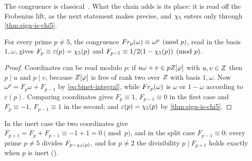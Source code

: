 \begin{remark}
The congruence is classical~\cite{lucas1878,lehmer30}.  What the chain adds is its place: it is
read off the Frobenius lift, as the next statement makes precise, and $\chi_5$ enters only through
\cref{thm:sign-is-chi5}.
\end{remark}

\begin{corollary}\label{thm:chi5-from-frobenius}
For every prime $p\ne5$, the congruence $Fr_p(\omega)\equiv\omega^p\pmod p$, read in the basis
$1,\omega$, gives $F_p\equiv\varepsilon(p)=\chi_5(p)$ and $F_{p-1}\equiv1/2(1-\chi_5(p))\pmod p$.
\end{corollary}
\begin{proof}
Coordinates can be read modulo $p$: if
$u\omega+v\in pZ[\varphi]$ with $u,v\in Z$ then $p\mid u$ and $p\mid v$, because $Z[\varphi]$ is free of rank two
over $Z$ with basis $1,\omega$.  Now
$\omega^p=F_p\omega+F_{p-1}$ by \eqref{eq:binet-integral}, while
$Fr_p(\omega)$ is $\omega$ or $1-\omega$ according to $\varepsilon(p)$.  Comparing
coordinates gives $F_p\equiv1$, $F_{p-1}\equiv0$ in the first case and
$F_p\equiv-1$, $F_{p-1}\equiv1$ in the second; and $\varepsilon(p)=\chi_5(p)$ by
\cref{thm:sign-is-chi5}.
\end{proof}

In the inert case the two coordinates give $F_{p+1}=F_p+F_{p-1}\equiv-1+1=0\pmod p$, and in the split
case $F_{p-1}\equiv0$: every prime $p\ne5$ divides $F_{p-\chi_5(p)}$, and for $p\ne2$ the divisibility
$p\mid F_{p+1}$ holds exactly when $p$ is inert ().

